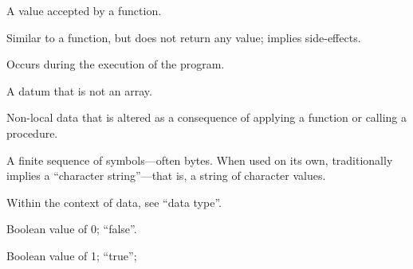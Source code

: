 \begin{description}
  A value accepted by a function.

  Similar to a function, but does not return any value; implies side-effects.

  Occurs during the execution of the program.

  A datum that is not an array.

  Non-local data that is altered as a consequence of applying a function or
  calling a procedure.

  A finite sequence of symbols---often bytes. When used on its own,
  traditionally implies a ``character string''---that is, a string of character
  values.

  Within the context of data, see ``data type''.

  \dt{$\bot$}
  Boolean value of 0; ``false''.

  \dt{$\top$}
  Boolean value of 1; ``true'';
\end{description}

\enddeptgroup
